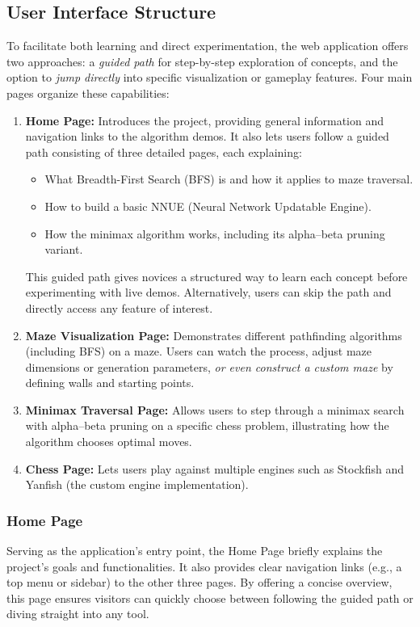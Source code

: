 \documentclass[12pt,a4paper]{article}
\begin{document}
    \subsection{User Interface Structure}
    To facilitate both learning and direct experimentation, the web application offers two approaches:
    a \emph{guided path} for step-by-step exploration of concepts, and the option to \emph{jump directly}
    into specific visualization or gameplay features. Four main pages organize these capabilities:
    \begin{enumerate}
      \item \textbf{Home Page:} Introduces the project, providing general information and navigation links to the algorithm demos. It also lets users follow a guided path consisting of three detailed pages, each explaining:
        \begin{itemize}
          \item What Breadth-First Search (BFS) is and how it applies to maze traversal.
          \item How to build a basic NNUE (Neural Network Updatable Engine).
          \item How the minimax algorithm works, including its alpha--beta pruning variant.
        \end{itemize}
        This guided path gives novices a structured way to learn each concept before experimenting with live demos. Alternatively, users can skip the path and directly access any feature of interest.
      \item \textbf{Maze Visualization Page:} Demonstrates different pathfinding algorithms (including BFS) on a maze. Users can watch the process, adjust maze dimensions or generation parameters, \emph{or even construct a custom maze} by defining walls and starting points.
      \item \textbf{Minimax Traversal Page:} Allows users to step through a minimax search with alpha--beta pruning on a specific chess problem, illustrating how the algorithm chooses optimal moves.
      \item \textbf{Chess Page:} Lets users play against multiple engines such as Stockfish and Yanfish (the custom engine implementation).
    \end{enumerate}
    
    \subsubsection{Home Page}
    Serving as the application's entry point, the Home Page briefly explains the project's goals and functionalities. It also provides clear navigation links (e.g., a top menu or sidebar) to the other three pages. By offering a concise overview, this page ensures visitors can quickly choose between following the guided path or diving straight into any tool.
    
\end{document}

